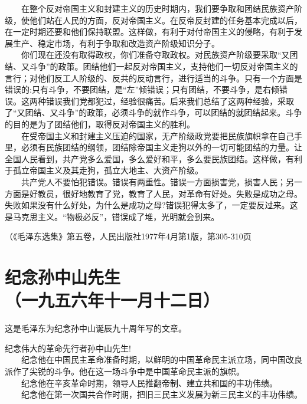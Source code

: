 \documentclass[cn,11pt,chinese]{elegantbook}
\def\myformat#1{\hfil\hfil #1}
\begin{document}
　　在整个反对帝国主义和封建主义的历史时期内，我们要争取和团结民族资产阶级，使他们站在人民的方面，反对帝国主义。在反帝反封建的任务基本完成以后，在一定时期还要和他们保持联盟。这样做，有利于对付帝国主义的侵略，有利于发展生产、稳定市场，有利于争取和改造资产阶级知识分子。\\
　　你们现在还没有取得政权，你们准备夺取政权。对民族资产阶级要采取“又团结、又斗争”的政策。团结他们一起反对帝国主义，支持他们一切反对帝国主义的言行；对他们反工人阶级的、反共的反动言行，进行适当的斗争。只有一个方面是错误的:只有斗争，不要团结，是“左”倾错误；只有团结，不要斗争，是右倾错误。这两种错误我们党都犯过，经验很痛苦。后来我们总结了这两种经验，采取了“又团结、又斗争”的政策，必须斗争的就作斗争，可以团结的就团结起来。斗争的目的是为了团结他们，取得反对帝国主义的胜利。\\
　　在受帝国主义和封建主义压迫的国家，无产阶级政党要把民族旗帜拿在自己手里，必须有民族团结的纲领，团结除帝国主义走狗以外的一切可能团结的力量。让全国人民看到，共产党多么爱国，多么爱好和平，多么要民族团结。这样做，有利于孤立帝国主义及其走狗，孤立大地主、大资产阶级。\\
　　共产党人不要怕犯错误。错误有两重性。错误一方面损害党，损害人民；另一方面是好教员，很好地教育了党，教育了人民，对革命有好处。失败是成功之母。失败如果没有什么好处，为什么是成功之母?错误犯得太多了，一定要反过来。这是马克思主义。“物极必反”，错误成了堆，光明就会到来。\\
\begin{flushright}（《毛泽东选集》第五卷，人民出版社1977年4月第1版，第305-310页\end{flushright}
\newpage\section*{\myformat{纪念孙中山先生}\\\myformat{（一九五六年十一月十二日）}}
\begin{introduction}\item  这是毛泽东为纪念孙中山诞辰九十周年写的文章。\end{introduction}
纪念伟大的革命先行者孙中山先生!\\
　　纪念他在中国民主革命准备时期，以鲜明的中国革命民主派立场，同中国改良派作了尖锐的斗争。他在这一场斗争中是中国革命民主派的旗帜。\\
　　纪念他在辛亥革命时期，领导人民推翻帝制、建立共和国的丰功伟绩。\\
　　纪念他在第一次国共合作时期，把旧三民主义发展为新三民主义的丰功伟绩。\\
\end{document}
